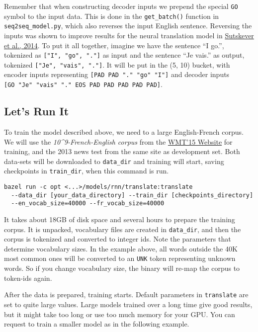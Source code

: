 Remember that when constructing decoder inputs we prepend the special
\texttt{GO} symbol to the input data. This is done in the
\texttt{get\_batch()} function in \texttt{seq2seq\_model.py}, which also
reverses the input English sentence. Reversing the inputs was shown to
improve results for the neural translation model in
\href{http://arxiv.org/abs/1409.3215}{Sutskever et al., 2014}. To put it
all together, imagine we have the sentence ``I go.'', tokenized as
\texttt{{[}"I",\ "go",\ "."{]}} as input and the sentence ``Je vais.''
as output, tokenized \texttt{{[}"Je",\ "vais",\ "."{]}}. It will be put
in the (5, 10) bucket, with encoder inputs representing
\texttt{{[}PAD\ PAD\ "."\ "go"\ "I"{]}} and decoder inputs
\texttt{{[}GO\ "Je"\ "vais"\ "."\ EOS\ PAD\ PAD\ PAD\ PAD\ PAD{]}}.

\subsection{Let's Run It }\label{lets-run-it}

To train the model described above, we need to a large English-French
corpus. We will use the \emph{10\^{}9-French-English corpus} from the
\href{http://www.statmt.org/wmt15/translation-task.html}{WMT'15 Website}
for training, and the 2013 news test from the same site as development
set. Both data-sets will be downloaded to \texttt{data\_dir} and
training will start, saving checkpoints in \texttt{train\_dir}, when
this command is run.

\begin{verbatim}
bazel run -c opt <...>/models/rnn/translate:translate
  --data_dir [your_data_directory] --train_dir [checkpoints_directory]
  --en_vocab_size=40000 --fr_vocab_size=40000
\end{verbatim}

It takes about 18GB of disk space and several hours to prepare the
training corpus. It is unpacked, vocabulary files are created in
\texttt{data\_dir}, and then the corpus is tokenized and converted to
integer ids. Note the parameters that determine vocabulary sizes. In the
example above, all words outside the 40K most common ones will be
converted to an \texttt{UNK} token representing unknown words. So if you
change vocabulary size, the binary will re-map the corpus to token-ids
again.

After the data is prepared, training starts. Default parameters in
\texttt{translate} are set to quite large values. Large models trained
over a long time give good results, but it might take too long or use
too much memory for your GPU. You can request to train a smaller model
as in the following example.

